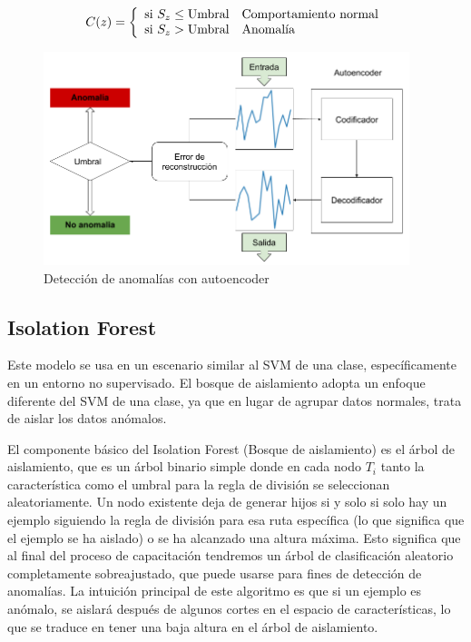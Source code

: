 \begin{equation}
C(z) = \left\lbrace
\begin{array}{ll}
\textup{si } S_{z}\leq \textup{Umbral} & \textup{Comportamiento normal}\\
\textup{si } S_{z}> \textup{Umbral} & \textup{Anomal\'{i}a}
\end{array}
\right.
\label{eqn:threshold}
\end{equation}

\begin{figure}[h!]
  \begin{center}	\includegraphics[width=0.95\textwidth]{imagenes/Cap4/autoencoder-anomaly}
  \caption{Detecci\'{o}n de anomal\'{i}as con autoencoder} 
  \label{fig:autoencoder-anomaly}
  \end{center}
\end{figure}

\subsection{Isolation Forest}

Este modelo se usa en un escenario similar al SVM de una clase, específicamente en un entorno no supervisado. El bosque de aislamiento adopta un enfoque diferente del SVM de una clase, ya que en lugar de agrupar datos normales, trata de aislar los datos anómalos.

\vspace{5mm} %

El componente básico del Isolation Forest (Bosque de aislamiento) es el árbol de aislamiento, que es un árbol binario simple donde en cada nodo $T_{i}$ tanto la característica como el umbral para la regla de división se seleccionan aleatoriamente. Un nodo existente deja de generar hijos si y solo si solo hay un ejemplo siguiendo la regla de división para esa ruta específica (lo que significa que el ejemplo se ha aislado) o se ha alcanzado una altura máxima. Esto significa que al final del proceso de capacitación tendremos un árbol de clasificación aleatorio completamente sobreajustado, que puede usarse para fines de detección de anomalías. La intuición principal de este algoritmo es que si un ejemplo es anómalo, se aislará después de algunos cortes en el espacio de características, lo que se traduce en tener una baja altura en el árbol de aislamiento.

